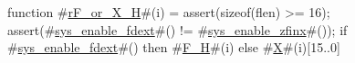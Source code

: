 function #\hyperref[sailRISCVzrFzyorzyXzyH]{rF\_or\_X\_H}#(i) = {
  assert(sizeof(flen) >= 16);
  assert(#\hyperref[sailRISCVzsyszyenablezyfdext]{sys\_enable\_fdext}#() != #\hyperref[sailRISCVzsyszyenablezyzzfinx]{sys\_enable\_zfinx}#());
  if   #\hyperref[sailRISCVzsyszyenablezyfdext]{sys\_enable\_fdext}#()
  then #\hyperref[sailRISCVzFzyH]{F\_H}#(i)
  else #\hyperref[sailRISCVzX]{X}#(i)[15..0]
}
